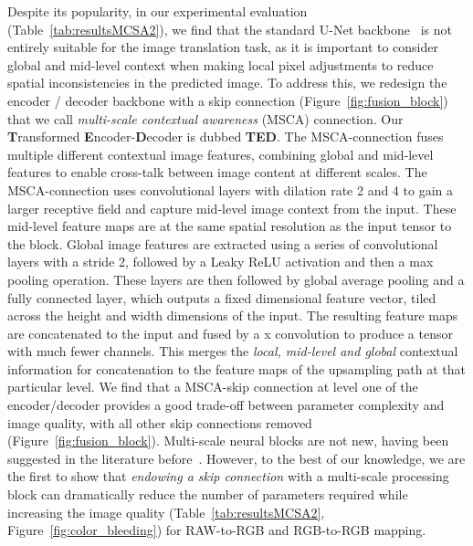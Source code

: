 \documentclass[a4paper,conference]{IEEEtran}
\begin{document}
Despite its popularity, in our experimental evaluation (Table~\ref{tab:resultsMCSA2}), we find that the standard U-Net backbone~\cite{Ronneberger15,Chen2018DPE,Chen2018} is not entirely suitable for the image translation task, as it is important to consider global and mid-level context when making local pixel adjustments to reduce spatial inconsistencies in the predicted image. To address this, we redesign the encoder / decoder backbone with a skip connection (Figure~\ref{fig:fusion_block}) that we call \emph{multi-scale contextual awareness} (MSCA) connection. Our \textbf{T}ransformed \textbf{E}ncoder-\textbf{D}ecoder is dubbed \textbf{TED}. The MSCA-connection fuses multiple different contextual image features, combining global and mid-level features to enable cross-talk between image content at different scales. The MSCA-connection uses convolutional layers with dilation rate 2 and 4 to gain a larger receptive field and capture mid-level image context from the input. These mid-level feature maps are at the same spatial resolution as the input tensor to the block. Global image features are extracted using a series of convolutional layers with a stride 2, followed by a Leaky ReLU activation and then a max pooling operation. These layers are then followed by global average pooling and a fully connected layer, which outputs a fixed dimensional feature vector, tiled across the height and width dimensions of the input. The resulting feature maps are concatenated to the input and fused by a x convolution to produce a tensor with much fewer channels. This merges the \emph{local, mid-level and global} contextual information for concatenation to the feature maps of the upsampling path at that particular level. We find that a MSCA-skip connection at level one of the encoder/decoder provides a good trade-off between parameter complexity and image quality, with all other skip connections removed (Figure~\ref{fig:fusion_block}). Multi-scale neural blocks are not new, having been suggested in the literature before~\cite{gharbi2017deep,Chen2018,Marnerides18}. However, to the best of our knowledge, we are the first to show that \emph{endowing a skip connection} with a multi-scale processing block can dramatically reduce the number of parameters required while increasing the image quality (Table~\ref{tab:resultsMCSA2}, Figure~\ref{fig:color_bleeding}) for RAW-to-RGB and RGB-to-RGB mapping. 
\end{document}
